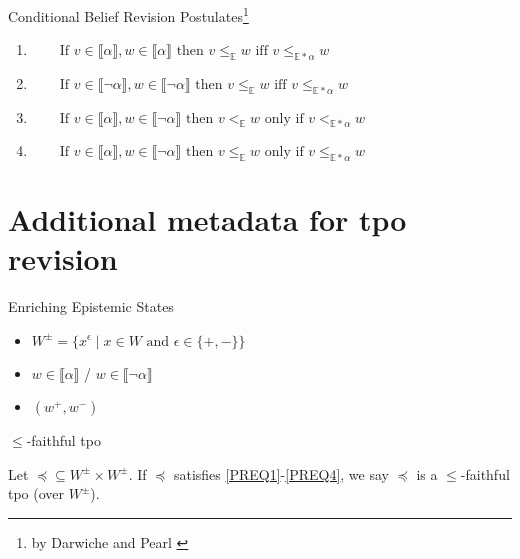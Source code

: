 \documentclass[11pt]{beamer}
\newcommand{\modelsOf}[1]{\llbracket #1 \rrbracket}
\begin{document}
\begin{frame}{Conditional Belief Revision Postulates\footnote{by Darwiche and Pearl \cite{Darwiche1997}}}
    \begin{enumerate}[wide=0pt, widest=99,leftmargin=\parindent,label = (CR$\arabic*$)]
        \item\label{CR1} $\qquad \textrm{If } v\in \modelsOf{\alpha}, w \in \modelsOf{\alpha} \textrm{ then } v \leq_{\mathbb{E}} w \textrm{ iff } v \leq_{\mathbb{E\ast\alpha}} w$
        \item\label{CR2} $\qquad \textrm{If } v\in \modelsOf{\neg\alpha}, w \in \modelsOf{\neg\alpha} \textrm{ then } v \leq_{\mathbb{E}} w \textrm{ iff } v \leq_{\mathbb{E\ast\alpha}} w$
        \item\label{CR3} $\qquad \textrm{If } v\in \modelsOf{\alpha}, w \in \modelsOf{\neg\alpha} \textrm{ then } v <_{\mathbb{E}} w \textrm{ only if } v <_{\mathbb{E\ast\alpha}} w$
        \item\label{CR4} $\qquad \textrm{If } v\in \modelsOf{\alpha}, w \in \modelsOf{\neg\alpha} \textrm{ then } v \leq_{\mathbb{E}} w \textrm{ only if } v \leq_{\mathbb{E\ast\alpha}} w$
    \end{enumerate}
    \note{
        \begin{itemize}
            \item 
        \end{itemize}
    }
\end{frame}

\section{Additional metadata for tpo revision}

\begin{frame}{Enriching Epistemic States}
    \begin{itemize}
        \item $W^{\pm} = \{x^{\epsilon} \mid x \in W \textrm{ and } \epsilon \in \{+, -\}\}$
        \item $w \in \modelsOf{\alpha}$ / $w \in \modelsOf{\neg\alpha}$
        \item $(w^{+}, w^{-})$
    \end{itemize}
\end{frame}

\begin{frame}{$\leq$-faithful tpo}
    \begin{definition}
        \label{definition:faithful-tpo}Let $\preceq \subseteq W^{\pm} \times W^{\pm}$. If $\preceq$ satisfies \ref{PREQ1}-\ref{PREQ4}, we say $\preceq$ is a $\leq$-faithful tpo (over $W^{\pm}$).
    \end{definition}
\end{frame}
\end{document}
